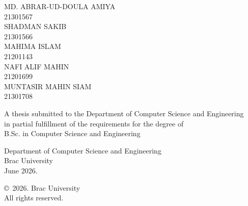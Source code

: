 \begin{titlepage}
\renewcommand*{\thepage}{Title} %

    \begin{center} 
        \vspace*{3cm} %
        
        {\fontsize{16pt}{22pt}\selectfont{A Blockchain-Integrated Framework for Secure, Incentivized, and Scalable Machine Learning: Integrating Consensus Mechanisms and Reinforcement Learning}
        } %
        
        \vspace{1.5cm}
        
        
        \vspace{0.5cm}
        
        	MD. ABRAR-UD-DOULA AMIYA\\
	        21301567\\
	        SHADMAN SAKIB\\
	        21301566\\
                MAHIMA ISLAM\\
	        21201143\\
	        NAFI ALIF MAHIN\\
	        21201699\\
	        MUNTASIR MAHIN SIAM\\
	        21301708\\

            

        \vspace{1.5cm}
        
        	A thesis submitted to the Department of Computer Science and Engineering\\
            in partial fulfillment of the requirements for the degree of\\
            B.Sc. in Computer Science and Engineering

        
        \vspace{2.5cm}
        
    		Department of Computer Science and Engineering\\
            Brac University\\
            June 2026.
        
        \vspace{3cm}
        
    		\copyright\ 2026. Brac University\\
            All rights reserved.
    
    \end{center}

\end{titlepage}